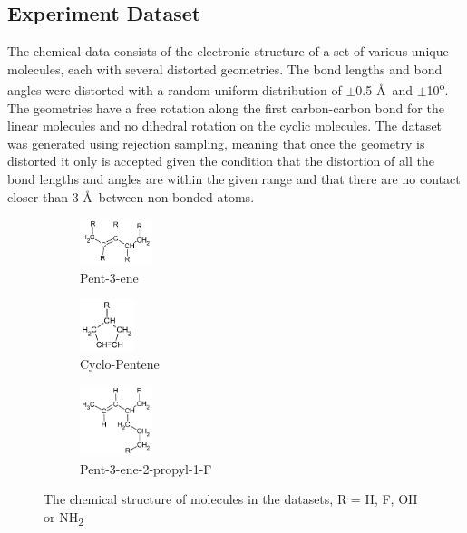 \documentclass[twoside,11pt]{article}
\begin{document}
\subsection{Experiment Dataset}

The chemical data consists of the electronic structure of a set of various unique molecules, each with several distorted geometries. The bond lengths and bond angles were distorted with a random uniform distribution of $\pm$0.5 \AA\ and $\pm$10\textsuperscript{o}. The geometries have a free rotation along the first carbon-carbon bond for the linear molecules and no dihedral rotation on the cyclic molecules. The dataset was generated using rejection sampling, meaning that once the geometry is distorted it only is accepted given the condition that the distortion of all the bond lengths and angles are within the given range and that there are no contact closer than 3 \AA\ between non-bonded atoms.

\begin{figure}[h!]
\centering
\begin{subfigure}{.3\textwidth}
  \centering
  \includegraphics[width=80px]{pent3ene.pdf}
  \caption{Pent-3-ene}
  \label{fig:pent3ene}
\end{subfigure}%
\begin{subfigure}{.3\textwidth}
  \centering
  \includegraphics[width=60px]{RcycloPenteneHs.pdf}
  \caption{Cyclo-Pentene}
  \label{fig:cycloPen}
\end{subfigure}
\begin{subfigure}{.3\textwidth}
  \centering
  \includegraphics[width=80px]{pent3ene2propNOF.pdf}
  \caption{Pent-3-ene-2-propyl-1-F}
  \label{fig:propSub}
\end{subfigure}
\caption{The chemical structure of molecules in the datasets, R = H, F, OH or NH\textsubscript{2}}
\label{fig:Molecules}
\end{figure}
\end{document}
